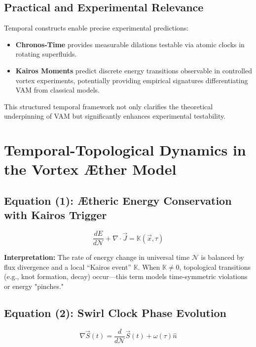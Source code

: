 \subsection{Practical and Experimental Relevance}

Temporal constructs enable precise experimental predictions:
\begin{itemize}
    \item \textbf{Chronos-Time} provides measurable dilations testable via atomic clocks in rotating superfluids.
    \item \textbf{Kairos Moments} predict discrete energy transitions observable in controlled vortex experiments, potentially providing empirical signatures differentiating VAM from classical models.
\end{itemize}

This structured temporal framework not only clarifies the theoretical underpinning of VAM but significantly enhances experimental testability.


\section{Temporal-Topological Dynamics in the Vortex Æther Model}

\subsection*{Equation (1): Ætheric Energy Conservation with Kairos Trigger}
\begin{equation}
    \frac{dE}{d\mathcal{N}} + \nabla \cdot \vec{J} = \mathbb{K}(\vec{x}, \tau)
    \label{eq:Kairos_trigger_energy_conservation}
\end{equation}

\textbf{Interpretation:} The rate of energy change in universal time $\mathcal{N}$ is balanced by flux divergence and a local ``Kairos event'' $\mathbb{K}$. When $\mathbb{K} \neq 0$, topological transitions (e.g., knot formation, decay) occur—this term models time-symmetric violations or energy "pinches."

\subsection*{Equation (2): Swirl Clock Phase Evolution}
\begin{equation}
    \nabla \vec{S}(t) = \frac{d}{d\mathcal{N}} \vec{S}(t) + \omega(\tau) \hat{n}
\label{eq:Swirl_clock_phase_evolution}
\end{equation}

